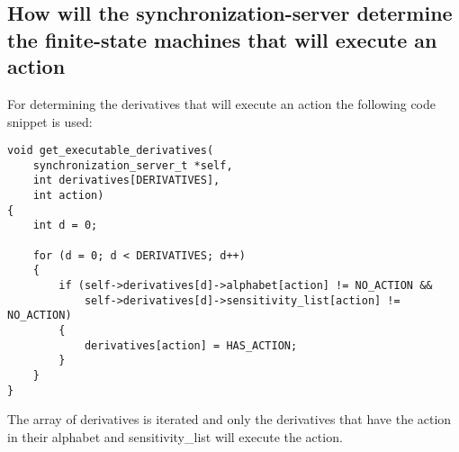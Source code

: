 \hypertarget{how-will-the-synchronization-server-determine-the-finite-state-machines-that-will-execute-an-action}{%
\subsection{How will the synchronization-server determine the
finite-state machines that will execute an
action}\label{how-will-the-synchronization-server-determine-the-finite-state-machines-that-will-execute-an-action}}

For determining the derivatives that will execute an action the
following code snippet is used:

\begin{verbatim}
void get_executable_derivatives(
    synchronization_server_t *self,
    int derivatives[DERIVATIVES],
    int action)
{
    int d = 0;

    for (d = 0; d < DERIVATIVES; d++)
    {
        if (self->derivatives[d]->alphabet[action] != NO_ACTION &&
            self->derivatives[d]->sensitivity_list[action] != NO_ACTION)
        {
            derivatives[action] = HAS_ACTION;
        }
    }
}
\end{verbatim}

The array of derivatives is iterated and only the derivatives that have
the action in their alphabet and sensitivity\_list will execute the
action.
